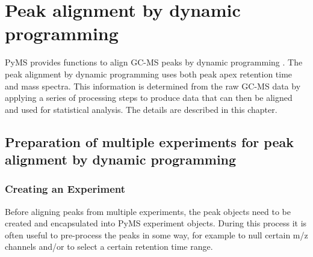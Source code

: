 

\chapter{Peak alignment by dynamic programming}

PyMS provides functions to align GC-MS peaks by dynamic programming
\cite{Robinson07}.  The peak alignment by dynamic programming uses both peak
apex retention time and mass spectra.  This information is determined from the
raw GC-MS data by applying a series of processing steps to produce data that
can then be aligned and used for statistical analysis.  The details are
described in this chapter.

\section{Preparation of multiple experiments for peak alignment
by dynamic programming}

\subsection{Creating an Experiment}


Before aligning peaks from multiple experiments, the peak objects need to be
created and encapsulated into PyMS experiment objects. During this process
it is often useful to pre-process the peaks in some way, for example to
null certain m/z channels and/or to select a certain retention time range.


